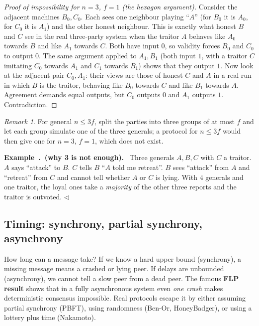 \documentclass[11pt,a4paper]{article}
\newcounter{exn}[section]
\renewcommand{\theexn}{\thesection.\arabic{exn}}
\newenvironment{plainenglish}{\par\smallskip}{\par\smallskip}
\newenvironment{formal}{\par\smallskip}{\par\smallskip}
\newenvironment{exbox}[1][]{\par\medskip\refstepcounter{exn}\noindent\textbf{Example~\theexn\if\relax\detokenize{#1}\relax\else\ (#1)\fi.}\ \ignorespaces}{\hfill$\triangleleft$\par\medskip}
\theoremstyle{definition}
\theoremstyle{plain}
\theoremstyle{remark}
\newtheorem{remark}[definition]{Remark}
\begin{document}
\begin{formal}
\begin{proof}[Proof of impossibility for $n=3$, $f=1$ (the hexagon argument)]
Consider the adjacent machines $B_0,C_0$. Each sees one neighbour playing ``$A$'' (for $B_0$ it is $A_0$, for $C_0$ it is $A_1$) and the other honest neighbour. This is exactly what honest $B$ and $C$ see in the real three-party system when the traitor $A$ behaves like $A_0$ towards $B$ and like $A_1$ towards $C$. Both have input $0$, so validity forces $B_0$ and $C_0$ to output $0$. The same argument applied to $A_1,B_1$ (both input $1$, with a traitor $C$ imitating $C_0$ towards $A_1$ and $C_1$ towards $B_1$) shows that they output $1$. Now look at the adjacent pair $C_0,A_1$: their views are those of honest $C$ and $A$ in a real run in which $B$ is the traitor, behaving like $B_0$ towards $C$ and like $B_1$ towards $A$. Agreement demands equal outputs, but $C_0$ outputs $0$ and $A_1$ outputs $1$. Contradiction.
\end{proof}
\begin{remark}
For general $n\le3f$, split the parties into three groups of at most $f$ and let each group simulate one of the three generals; a protocol for $n\le 3f$ would then give one for $n=3$, $f=1$, which does not exist.
\end{remark}
\end{formal}

\begin{exbox}[why 3 is not enough]
Three generals $A,B,C$ with $C$ a traitor. $A$ says ``attack'' to $B$. $C$ tells $B$ ``$A$ told me retreat''. $B$ sees ``attack'' from $A$ and ``retreat'' from $C$ and cannot tell whether $A$ or $C$ is lying. With $4$ generals and one traitor, the
loyal ones take a \emph{majority} of the other three reports and the traitor is outvoted.
\end{exbox}

\subsection{Timing: synchrony, partial synchrony, asynchrony}

\begin{plainenglish}
How long can a message take? If we know a hard upper bound (synchrony), a missing message means a crashed or lying peer. If delays are unbounded (asynchrony), we cannot tell a slow peer from a dead peer. The famous \textbf{FLP result}
shows that in a fully asynchronous system even \emph{one crash} makes deterministic consensus impossible. Real protocols escape it by either assuming partial synchrony (PBFT), using randomness (Ben-Or, HoneyBadger),
or using a lottery plus time (Nakamoto).
\end{plainenglish}
\end{document}
